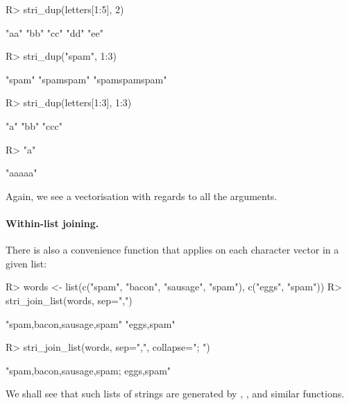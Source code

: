 \documentclass[nojss]{jss}
\begin{document}
\begin{Schunk}
\begin{Sinput}
R> stri_dup(letters[1:5], 2)
\end{Sinput}
\begin{Soutput}
[1] "aa" "bb" "cc" "dd" "ee"
\end{Soutput}
\begin{Sinput}
R> stri_dup("spam", 1:3)
\end{Sinput}
\begin{Soutput}
[1] "spam"         "spamspam"     "spamspamspam"
\end{Soutput}
\begin{Sinput}
R> stri_dup(letters[1:3], 1:3)
\end{Sinput}
\begin{Soutput}
[1] "a"   "bb"  "ccc"
\end{Soutput}
\begin{Sinput}
R> "a" %s*% 5
\end{Sinput}
\begin{Soutput}
[1] "aaaaa"
\end{Soutput}
\end{Schunk}

\noindent
Again, we see a vectorisation with regards to all the arguments.



\paragraph{Within-list joining.}
There is also a convenience function that applies 
on each character vector in a given list:

\begin{Schunk}
\begin{Sinput}
R> words <- list(c("spam", "bacon", "sausage", "spam"), c("eggs", "spam"))
R> stri_join_list(words, sep=",")
\end{Sinput}
\begin{Soutput}
[1] "spam,bacon,sausage,spam" "eggs,spam"
\end{Soutput}
\begin{Sinput}
R> stri_join_list(words, sep=",", collapse="; ")
\end{Sinput}
\begin{Soutput}
[1] "spam,bacon,sausage,spam; eggs,spam"
\end{Soutput}
\end{Schunk}

\noindent
We shall see that such lists of strings
are generated by , , and similar functions.
\end{document}
